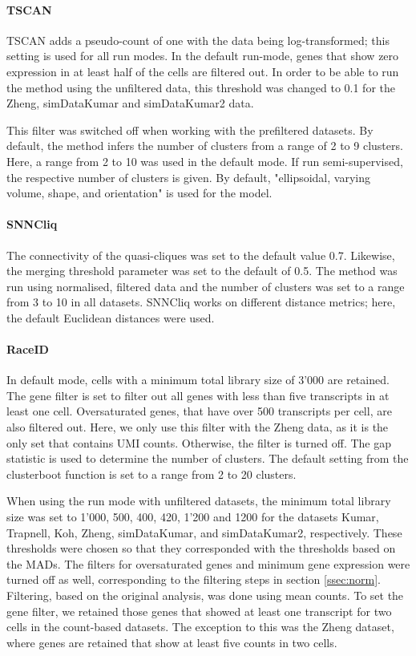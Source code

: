 \documentclass[12pt, a4paper]{article}\usepackage[]{graphicx}\usepackage[]{color}
\begin{document}
\paragraph{TSCAN}
TSCAN adds a pseudo-count of one with the data being log-transformed; this setting is used for all run modes. 
In the default run-mode, genes that show zero expression in at least half of the cells are filtered out. In order to be able to run the method using the unfiltered data, this threshold was changed to 0.1 for the Zheng, simDataKumar and simDataKumar2 data.

This filter was switched off when working with the prefiltered datasets. By default, the method infers the number of clusters from a range of 2 to 9 clusters. Here, a range from 2 to 10 was used in the default mode. If run semi-supervised, the respective number of clusters is given. By default, "ellipsoidal, varying volume, shape, and orientation" is used for the model.

\paragraph{SNNCliq}
The connectivity of the quasi-cliques was set to the default value 0.7. Likewise, the merging threshold parameter was set to the default of 0.5. The method was run using normalised, filtered data and the number of clusters was set to a range from 3 to 10 in all datasets. SNNCliq works on different distance metrics; here, the default Euclidean distances were used.

\paragraph{RaceID}

In default mode, cells with a minimum total library size of 3'000 are retained. The gene filter is set to filter out all genes with less than five transcripts in at least one cell. Oversaturated genes, that have over 500 transcripts per cell, are also filtered out. Here, we only use this filter with the Zheng data, as it is the only set that contains UMI counts. Otherwise, the filter is turned off. The gap statistic is used to determine the number of clusters. The default setting from the clusterboot function is set to a range from 2 to 20 clusters.

When using the run mode with unfiltered datasets, the minimum total library size was set to 1'000, 500, 400, 420, 1'200 and 1200 for the datasets Kumar, Trapnell, Koh, Zheng, simDataKumar, and simDataKumar2, respectively. These thresholds were chosen so that they corresponded with the thresholds based on the MADs. The filters for oversaturated genes and minimum gene expression were turned off as well, corresponding to the filtering steps in section \ref{ssec:norm}.
Filtering, based on the original analysis, was done using mean counts. To set the gene filter, we retained those genes that showed at least one transcript for two cells in the count-based datasets. The exception to this was the Zheng dataset, where genes are retained that show at least five counts in two cells. 
\end{document}
